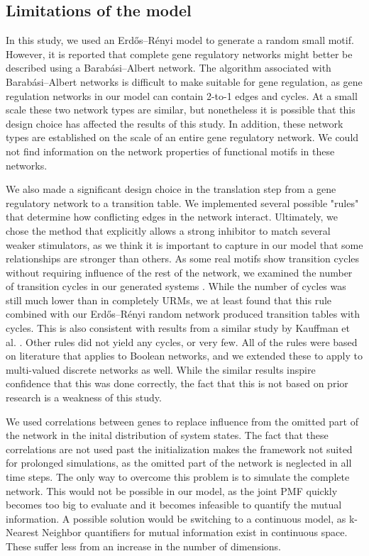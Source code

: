 \documentclass[../main.tex]{subfiles}
\begin{document}
\subsection{Limitations of the model}

In this study, we used an Erdős–Rényi model to generate a random small motif.
However, it is reported that complete gene regulatory networks might better be described using a Barabási–Albert network.
The algorithm associated with Barabási–Albert networks is difficult to make suitable for gene regulation, as gene regulation networks in our model can contain 2-to-1 edges and cycles.
At a small scale these two network types are similar, but nonetheless it is possible that this design choice has affected the results of this study.
In addition, these network types are established on the scale of an entire gene regulatory network.
We could not find information on the network properties of functional motifs in these networks.

We also made a significant design choice in the translation step from a gene regulatory network to a transition table.
We implemented several possible "rules" that determine how conflicting edges in the network interact.
Ultimately, we chose the method that explicitly allows a strong inhibitor to match several weaker stimulators, as we think it is important to capture in our model that some relationships are stronger than others.
As some real motifs show transition cycles without requiring influence of the rest of the network, we examined the number of transition cycles in our generated systems \cite{burda2011motifs}.
While the number of cycles was still much lower than in completely URMs, we at least found that this rule combined with our Erdős–Rényi random network produced transition tables with cycles.
This is also consistent with results from a similar study by Kauffman et al. \cite{kauffman2003random}.
Other rules did not yield any cycles, or very few.
All of the rules were based on literature that applies to Boolean networks, and we extended these to apply to multi-valued discrete networks as well.
While the similar results inspire confidence that this was done correctly, the fact that this is not based on prior research is a weakness of this study.

We used correlations between genes to replace influence from the omitted part of the network in the inital distribution of system states.
The fact that these correlations are not used past the initialization makes the framework not suited for prolonged simulations, as the omitted part of the network is neglected in all time steps.
The only way to overcome this problem is to simulate the complete network.
This would not be possible in our model, as the joint PMF quickly becomes too big to evaluate and it becomes infeasible to quantify the mutual information.
A possible solution would be switching to a continuous model, as k-Nearest Neighbor quantifiers for mutual information exist in continuous space.
These suffer less from an increase in the number of dimensions.
\end{document}
